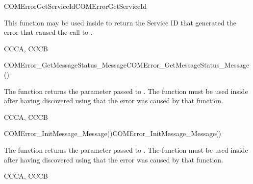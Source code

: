 
\begin{function_nopb2}{COMErrorGetServiceId}{COMErrorGetServiceId}
  \begin{fundescription}
    This function may be used inside  to return the
    Service ID that generated the error that caused the call to
    . 
  \end{fundescription}
  \begin{funreturn}
  \end{funreturn}
  \begin{funconformance}
    CCCA, CCCB
  \end{funconformance}
\end{function_nopb2}


\begin{function_nopb2}{COMError\_GetMessageStatus\_Message}{COMError_GetMessageStatus_Message()}
  \begin{fundescription}
    The function returns the  parameter passed to
    . The function must be used inside  
     after having discovered using  that the error 
     was caused by that function.
  \end{fundescription}
  \begin{funreturn}
  \end{funreturn}
  \begin{funconformance}
   CCCA, CCCB
  \end{funconformance}
\end{function_nopb2}

\begin{function_nopb2}{COMError\_InitMessage\_Message()}{COMError_InitMessage_Message()}
  \begin{fundescription}
    The function returns the  parameter passed to
    . The function must be used inside  
     after having discovered using  that the error 
     was caused by that function.
  \end{fundescription}
  \begin{funreturn}
  \end{funreturn}
  \begin{funconformance}
   CCCA, CCCB
  \end{funconformance}
\end{function_nopb2}

